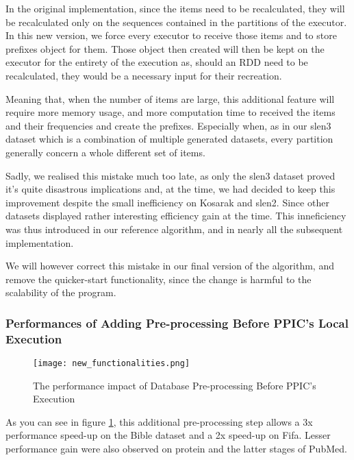 \documentclass{eplmastersthesis}
\begin{document}
In the original implementation, since the items need to be recalculated, they will be recalculated only on the sequences contained in the partitions of the executor. In this new version, we force every executor to receive those items and to store prefixes object for them. Those object then created will then be kept on the executor for the entirety of the execution as, should an RDD need to be recalculated, they would be a necessary input for their recreation. \newline

Meaning that, when the number of items are large, this additional feature will require more memory usage, and more computation time to received the items and their frequencies and create the prefixes. Especially when, as in our slen3 dataset which is a combination of multiple generated datasets, every partition generally concern a whole different set of items.\newline

Sadly, we realised this mistake much too late, as only the slen3 dataset proved it's quite disastrous implications and, at the time, we had decided to keep this improvement despite the small inefficiency on Kosarak and slen2. Since other datasets displayed rather interesting efficiency gain at the time. This inneficiency was thus introduced in our reference algorithm, and in nearly all the subsequent implementation. \newline

We will however correct this mistake in our final version of the algorithm, and remove the quicker-start functionality, since the change is harmful to the scalability of the program. \newline

\subsubsection{Performances of Adding Pre-processing Before PPIC's Local Execution}

\begin{figure}[h]
  \centering
  \texttt{[image: new\_functionalities.png]}
  \caption{The performance impact of Database Pre-processing Before PPIC's Execution}
  \label{fig:clean_before_PPIC}
\end{figure}

As you can see in figure \ref{fig:clean_before_PPIC}, this additional pre-processing step allows a 3x performance speed-up on the Bible dataset and a 2x speed-up on Fifa. Lesser performance gain were also observed on protein and the latter stages of PubMed. \newline
\end{document}

